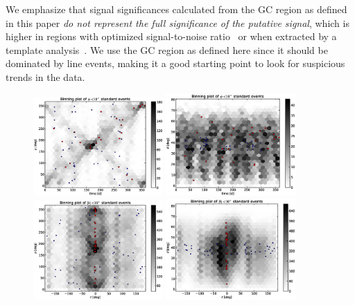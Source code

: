 \documentclass[aps,twocolumn,prd,superscriptaddress,showpacs,nofootinbib,fixfloat]{revtex4}
\begin{document}
We emphasize that signal significances calculated from the GC region as
defined in this paper \emph{do not represent the full significance of the
  putative signal}, which is higher in regions with optimized signal-to-noise
ratio~\cite{Bringmann:2012, Weniger:2012} or when extracted by a template
analysis~\cite{linepaper}. We use the GC region as defined here since it
should be dominated by line events, making it a good starting point to look
for suspicious trends in the data.


% 

\begin{figure}
  \centering
  \includegraphics[width=0.44\textwidth]{plots/TIME_PHI.eps}
  \includegraphics[width=0.44\textwidth]{plots/TIME_THETA.eps}
  \includegraphics[width=0.44\textwidth]{plots/L_PHI.eps}
  \includegraphics[width=0.44\textwidth]{plots/L_THETA.eps}

\end{figure}
\end{document}
